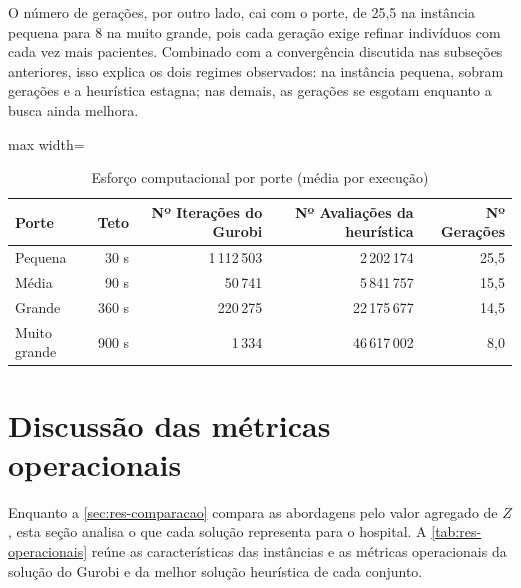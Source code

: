 O número de gerações, por outro lado, cai com o porte, de 25,5 na instância pequena para 8 na muito grande, pois cada geração exige refinar indivíduos com cada vez mais pacientes. Combinado com a convergência discutida nas subseções anteriores, isso explica os dois regimes observados: na instância pequena, sobram gerações e a heurística estagna; nas demais, as gerações se esgotam enquanto a busca ainda melhora.

\begin{table}[htbp]
    \caption{Esforço computacional por porte (média por execução)}
    \label{tab:res-esforco}
    \centering
    \begin{adjustbox}{max width=\textwidth}
    \begin{tabular}{lrrrr}
        \hline
        \textbf{Porte} & \textbf{Teto} & \textbf{Nº Iterações do Gurobi} & \textbf{Nº Avaliações da heurística} & \textbf{Nº Gerações} \\
        \hline
        Pequena      & 30 s  & 1\,112\,503 & 2\,202\,174  & 25,5 \\
        Média        & 90 s  & 50\,741     & 5\,841\,757  & 15,5 \\
        Grande       & 360 s & 220\,275    & 22\,175\,677 & 14,5 \\
        Muito grande & 900 s & 1\,334      & 46\,617\,002 & 8,0  \\
        \hline
    \end{tabular}
    \end{adjustbox}
\end{table}

\clearpage

\section{Discussão das métricas operacionais}
\label{sec:res-operacionais}

Enquanto a \autoref{sec:res-comparacao} compara as abordagens pelo valor agregado de $Z$, esta seção analisa o que cada solução representa para o hospital. A \autoref{tab:res-operacionais} reúne as características das instâncias e as métricas operacionais da solução do Gurobi e da melhor solução heurística de cada conjunto.

